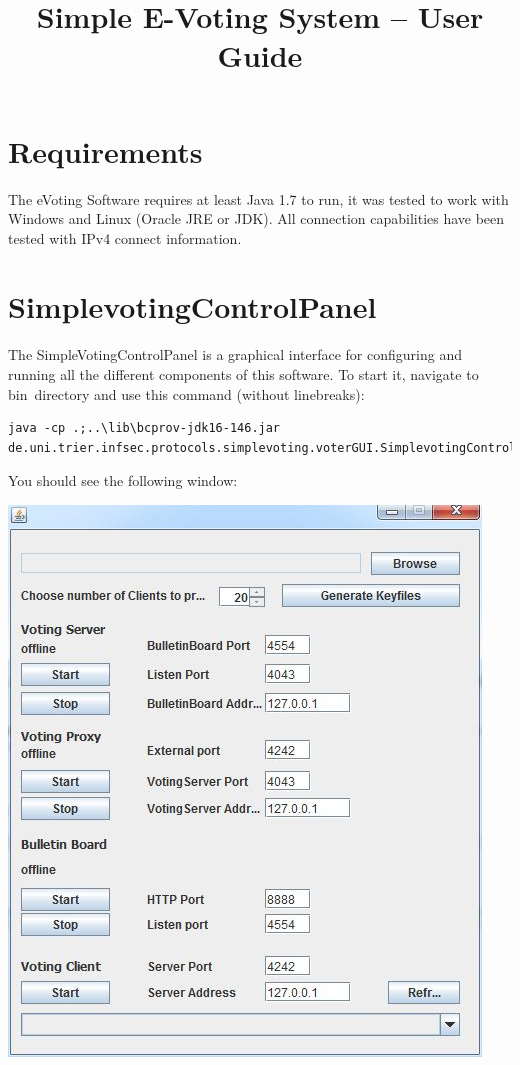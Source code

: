 \documentclass{article}
\title{Simple E-Voting System -- User Guide}
\begin{document}
\maketitle

\tableofcontents
\newpage

\section{Requirements}
The eVoting Software requires at least Java 1.7 to run, it was tested to work with Windows and Linux (Oracle JRE or JDK). All connection capabilities have been tested with IPv4 connect information.

\section{SimplevotingControlPanel}
The SimpleVotingControlPanel is a graphical interface for configuring and running all the different components of this software. To start it, navigate to bin\ directory and use this command (without linebreaks):
\begin{lstlisting}
java -cp .;..\lib\bcprov-jdk16-146.jar 
de.uni.trier.infsec.protocols.simplevoting.voterGUI.SimplevotingControlPanel
\end{lstlisting}
You should see the following window:\\
\begin{center}
\includegraphics{./controlpanel.jpg}
\end{center}
\end{document}
